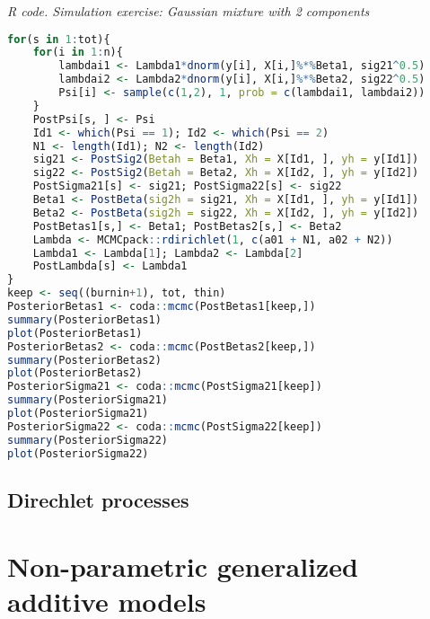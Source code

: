 \begin{tcolorbox}[enhanced,width=4.67in,center upper,
	fontupper=\large\bfseries,drop shadow southwest,sharp corners]
	\textit{R code. Simulation exercise: Gaussian mixture with 2 components}
	\begin{VF}
		\begin{lstlisting}[language=R]
for(s in 1:tot){
	for(i in 1:n){
		lambdai1 <- Lambda1*dnorm(y[i], X[i,]%*%Beta1, sig21^0.5)
		lambdai2 <- Lambda2*dnorm(y[i], X[i,]%*%Beta2, sig22^0.5)
		Psi[i] <- sample(c(1,2), 1, prob = c(lambdai1, lambdai2))
	}
	PostPsi[s, ] <- Psi
	Id1 <- which(Psi == 1); Id2 <- which(Psi == 2)
	N1 <- length(Id1); N2 <- length(Id2)
	sig21 <- PostSig2(Betah = Beta1, Xh = X[Id1, ], yh = y[Id1])
	sig22 <- PostSig2(Betah = Beta2, Xh = X[Id2, ], yh = y[Id2])
	PostSigma21[s] <- sig21; PostSigma22[s] <- sig22
	Beta1 <- PostBeta(sig2h = sig21, Xh = X[Id1, ], yh = y[Id1])
	Beta2 <- PostBeta(sig2h = sig22, Xh = X[Id2, ], yh = y[Id2])
	PostBetas1[s,] <- Beta1; PostBetas2[s,] <- Beta2
	Lambda <- MCMCpack::rdirichlet(1, c(a01 + N1, a02 + N2))
	Lambda1 <- Lambda[1]; Lambda2 <- Lambda[2]
	PostLambda[s] <- Lambda1 
}
keep <- seq((burnin+1), tot, thin)
PosteriorBetas1 <- coda::mcmc(PostBetas1[keep,])
summary(PosteriorBetas1)
plot(PosteriorBetas1)
PosteriorBetas2 <- coda::mcmc(PostBetas2[keep,])
summary(PosteriorBetas2)
plot(PosteriorBetas2)
PosteriorSigma21 <- coda::mcmc(PostSigma21[keep])
summary(PosteriorSigma21)
plot(PosteriorSigma21)
PosteriorSigma22 <- coda::mcmc(PostSigma22[keep])
summary(PosteriorSigma22)
plot(PosteriorSigma22)
\end{lstlisting}
	\end{VF}
\end{tcolorbox}

\subsection{Direchlet processes}\label{sec11_12}

\section{Non-parametric generalized additive models}\label{sec11_2}

